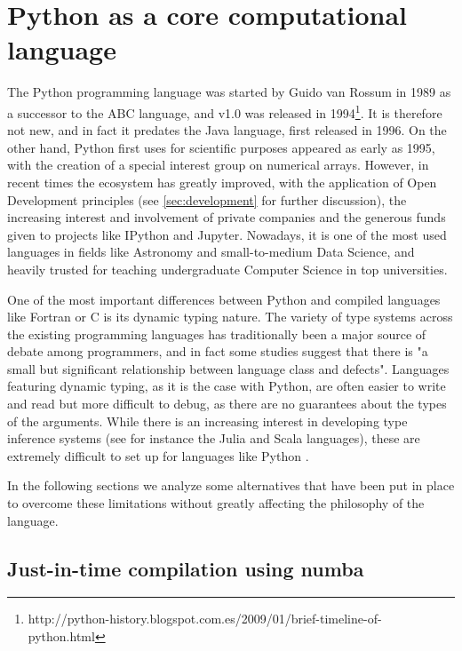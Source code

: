 \section{Python as a core computational language}
\label{sec:python}

The Python programming language was started by Guido van Rossum in 1989 as a successor to the ABC language, and v1.0 was released in 1994\footnote{http://python-history.blogspot.com.es/2009/01/brief-timeline-of-python.html}. It is therefore not new, and in fact it predates the Java language, first released in 1996. On the other hand, Python first uses for scientific purposes appeared as early as 1995, with the creation of a special interest group on numerical arrays\cite{Millman_2011}. However, in recent times the ecosystem has greatly improved, with the application of Open Development principles (see \ref{sec:development} for further discussion), the increasing interest and involvement of private companies and the generous funds given to projects like IPython\cite{Perez_2007} and Jupyter. Nowadays, it is one of the most used languages in fields like Astronomy\cite{2015arXiv150703989M} and small-to-medium Data Science, and heavily trusted for teaching undergraduate Computer Science in top universities\cite{guo2014python}.

One of the most important differences between Python and compiled languages like Fortran or C is its dynamic typing nature. The variety of type systems across the existing programming languages has traditionally been a major source of debate among programmers, and in fact some studies suggest that there is "a small but significant relationship between language class and defects"\cite{Ray2014}. Languages featuring dynamic typing, as it is the case with Python, are often easier to write and read but more difficult to debug, as there are no guarantees about the types of the arguments. While there is an increasing interest in developing type inference systems (see for instance the Julia and Scala languages), these are extremely difficult to set up for languages like Python \cite{cannon2005localized}.


In the following sections we analyze some alternatives that have been put in place to overcome these limitations without greatly affecting the philosophy of the language.

\subsection{Just-in-time compilation using numba}

